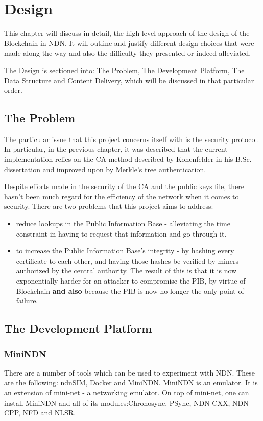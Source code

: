 \chapter{Design}
This chapter will discuss in detail, the high level approach of the design of the Blockchain in NDN. It will outline and justify different design choices that were made along the way and also the difficulty they presented or indeed alleviated. 

The Design is sectioned into: The Problem, The Development Platform, The Data Structure and Content Delivery, which will be discussed in that particular order.
\section{The Problem}
The particular issue that this project concerns itself with is the security protocol. In particular, in the previous chapter, it was described that the current implementation relies on the CA method described by Kohenfelder in his B.Sc. dissertation and improved upon by Merkle's tree authentication\cite{048}. \par
Despite efforts made in the security of the CA and the public keys file, there hasn't been much regard for the efficiency of the network when it comes to security. There are two problems that this project aims to address: \begin{itemize}

\item reduce lookups in the Public Information Base - alleviating the time constraint in having to request that information and go through it.
\item to increase the Public Information Base's integrity - by hashing every certificate to each other, and having those hashes be verified by miners authorized by the central authority. The result of this is that it is now exponentially harder for an attacker to compromise the PIB, by virtue of Blockchain \textbf{and also} because the PIB is now no longer the only point of failure.
\end{itemize}
\section{The Development Platform}
\subsection{MiniNDN}
There are a number of tools which can be used to experiment with NDN. These are the following: ndnSIM, Docker and MiniNDN.
MiniNDN is an emulator. It is an extension of mini-net - a networking emulator. On top of mini-net, one can install MiniNDN and all of its modules:Chronosync, PSync, NDN-CXX, NDN-CPP, NFD and NLSR.

